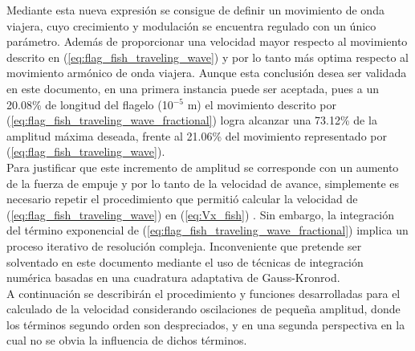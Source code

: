 Mediante esta nueva expresión se consigue de definir un movimiento de onda viajera, cuyo crecimiento y modulación se encuentra regulado con un único parámetro. Además de proporcionar una velocidad mayor respecto al movimiento descrito en (\ref{eq:flag_fish_traveling_wave}) y por lo tanto más optima respecto al movimiento armónico de onda viajera. Aunque esta conclusión desea ser validada en este documento, en una primera instancia puede ser aceptada, pues a un 20.08\% de longitud del flagelo (10$^{-5}$ m) el movimiento descrito por (\ref{eq:flag_fish_traveling_wave_fractional}) logra alcanzar una 73.12\% de la amplitud máxima deseada, frente al 21.06\% del movimiento representado por (\ref{eq:flag_fish_traveling_wave}).\\

Para justificar que este incremento de amplitud se corresponde con un aumento de la fuerza de empuje y por lo tanto de la velocidad de avance, simplemente es necesario repetir el procedimiento que permitió calcular la velocidad de (\ref{eq:flag_fish_traveling_wave}) en (\ref{eq:Vx_fish}) \cite{Gray1955}. Sin embargo, la integración del término exponencial de (\ref{eq:flag_fish_traveling_wave_fractional}) implica un proceso iterativo de resolución compleja. Inconveniente que pretende ser solventado en este documento mediante el uso de técnicas de integración numérica basadas en una cuadratura adaptativa de Gauss-Kronrod.\\

A continuación se describirán el procedimiento y funciones desarrolladas para el calculado de la velocidad considerando oscilaciones de pequeña amplitud, donde los términos segundo orden son despreciados, y en una segunda perspectiva en la cual no se obvia la influencia de dichos términos.



